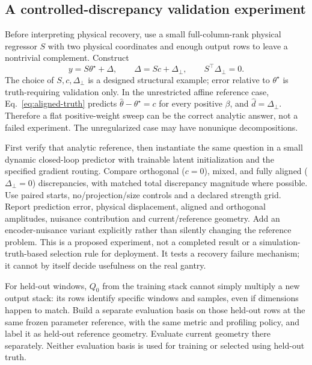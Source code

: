 \documentclass[11pt,a4paper]{article}
\theoremstyle{remark}
\begin{document}
\subsection{A controlled-discrepancy validation experiment}\label{sec:bias-validation}
Before interpreting physical recovery, use a small full-column-rank physical regressor $S$ with two physical coordinates and enough output rows to leave a nontrivial complement. Construct
\begin{equation}\label{eq:controlled-discrepancy}
 y=S\theta^\star+\Delta,\qquad
 \Delta=Sc+\Delta_\perp,\qquad S^\top\Delta_\perp=0.
\end{equation}
The choice of $S,c,\Delta_\perp$ is a designed structural example; error relative to $\theta^\star$ is truth-requiring validation only. In the unrestricted affine reference case, Eq.~\eqref{eq:aligned-truth} predicts $\hat\theta-\theta^\star=c$ for every positive $\beta$, and $\hat d=\Delta_\perp$. Therefore a flat positive-weight sweep can be the correct analytic answer, not a failed experiment. The unregularized case may have nonunique decompositions.

First verify that analytic reference, then instantiate the same question in a small dynamic closed-loop predictor with trainable latent initialization and the specified gradient routing. Compare orthogonal ($c=0$), mixed, and fully aligned ($\Delta_\perp=0$) discrepancies, with matched total discrepancy magnitude where possible. Use paired starts, no/projection/size controls and a declared strength grid. Report prediction error, physical displacement, aligned and orthogonal amplitudes, nuisance contribution and current/reference geometry. Add an encoder-nuisance variant explicitly rather than silently changing the reference problem. This is a proposed experiment, not a completed result or a simulation-truth-based selection rule for deployment. It tests a recovery failure mechanism; it cannot by itself decide usefulness on the real gantry.

For held-out windows, $Q_0$ from the training stack cannot simply multiply a new output stack: its rows identify specific windows and samples, even if dimensions happen to match. Build a separate evaluation basis on those held-out rows at the same frozen parameter reference, with the same metric and profiling policy, and label it as held-out reference geometry. Evaluate current geometry there separately. Neither evaluation basis is used for training or selected using held-out truth.

\appendix
\end{document}
